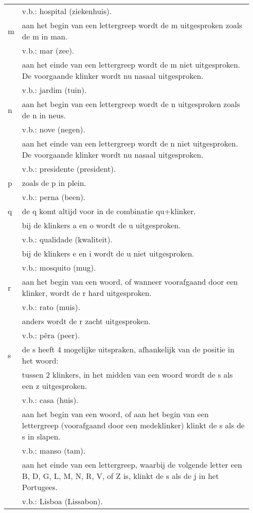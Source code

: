 \begin{longtable}{p{} p{}}
  & v.b.: hospital (ziekenhuis).\\
m & aan het begin van een lettergreep wordt de m uitgesproken zoals de m in man.\\
 & v.b.: mar (zee).\\
& aan het einde van een lettergreep wordt de m niet uitgesproken. De voorgaande klinker wordt nu nasaal uitgesproken.\\
 & v.b.: jardim (tuin).\\
n & aan het begin van een lettergreep wordt de n uitgesproken zoals de n in neus.\\
 & v.b.: nove (negen).\\
& aan het einde van een lettergreep wordt de n niet uitgesproken. De voorgaande klinker wordt nu nasaal uitgesproken.\\
 & v.b.: presidente (president).\\
p & zoals de p in plein.\\
 & v.b.: perna (been).\\
q & de q komt altijd voor in de combinatie qu+klinker.\\
& bij de klinkers a en o wordt de u uitgesproken.\\
& v.b.: qualidade (kwaliteit).\\
& bij de klinkers e en i wordt de u niet uitgesproken.\\
& v.b.: mosquito (mug).\\
r & aan het begin van een woord, of wanneer voorafgaand door een klinker, wordt de r hard uitgesproken.\\
 & v.b.: rato (muis).\\
& anders wordt de r zacht uitgesproken.\\
 & v.b.: pêra (peer).\\
s & de s heeft 4 mogelijke uitspraken, afhankelijk van de positie in het woord:\\
& tussen 2 klinkers, in het midden van een woord wordt de s als een z uitgesproken.\\
 & v.b.: casa (huis).\\
& aan het begin van een woord, of aan het begin van een lettergreep (voorafgaand door een medeklinker) klinkt de s als de s in slapen.\\
 & v.b.: manso (tam).\\
& aan het einde van een lettergreep, waarbij de volgende letter een B, D, G, L, M, N, R, V, of Z is, klinkt de s als de j in het Portugees.\\
 & v.b.: Lisboa (Lissabon).\\

\end{longtable}
